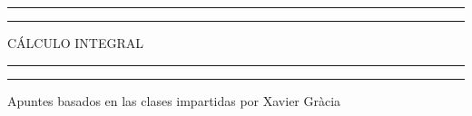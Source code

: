 \newcommand{\plogo}{\fbox{$\mathcal{PL}$}} %

\begin{titlepage} %

    \centering %

    \scshape %

    \vspace*{5\baselineskip} %


    \rule{\textwidth}{1.6pt}\vspace*{-\baselineskip}\vspace*{2pt} %
    \rule{\textwidth}{0.4pt} %

    \vspace{0.75\baselineskip} %

    {\LARGE CÁLCULO INTEGRAL\\} %

    \vspace{0.75\baselineskip} %

    \rule{\textwidth}{0.4pt}\vspace*{-\baselineskip}\vspace{3.2pt} %
    \rule{\textwidth}{1.6pt} %

    \vspace{1.5\baselineskip} %


    Apuntes basados en las clases impartidas por Xavier Gr\`acia

    \vspace*{1\baselineskip} %





\end{titlepage}
